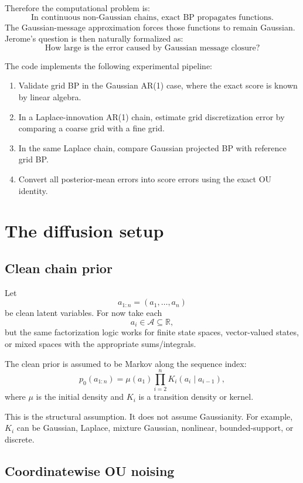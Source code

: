 \documentclass[11pt]{article}
\newcommand{\R}{\mathbb{R}}
\begin{document}
Therefore the computational problem is:
\[
\boxed{\text{In continuous non-Gaussian chains, exact BP propagates functions.}}
\]
The Gaussian-message approximation forces those functions to remain Gaussian. Jerome's question is then naturally formalized as:
\[
\boxed{\text{How large is the error caused by Gaussian message closure?}}
\]

The code implements the following experimental pipeline:
\begin{enumerate}[label=\arabic*.]
  \item Validate grid BP in the Gaussian AR(1) case, where the exact score is known by linear algebra.
  \item In a Laplace-innovation AR(1) chain, estimate grid discretization error by comparing a coarse grid with a fine grid.
  \item In the same Laplace chain, compare Gaussian projected BP with reference grid BP.
  \item Convert all posterior-mean errors into score errors using the exact OU identity.
\end{enumerate}

\section{The diffusion setup}

\subsection{Clean chain prior}

Let
\[
  a_{1:n}=(a_1,\ldots,a_n)
\]
be clean latent variables. For now take each
\[
  a_i\in\mathcal A\subseteq \R,
\]
but the same factorization logic works for finite state spaces, vector-valued states, or mixed spaces with the appropriate sums/integrals.

The clean prior is assumed to be Markov along the sequence index:
\begin{equation}
  p_0(a_{1:n})
  = \mu(a_1)\prod_{i=2}^n K_i(a_i\mid a_{i-1}),
  \label{eq:markov-prior}
\end{equation}
where \(\mu\) is the initial density and \(K_i\) is a transition density or kernel.

This is the structural assumption. It does not assume Gaussianity. For example, \(K_i\) can be Gaussian, Laplace, mixture Gaussian, nonlinear, bounded-support, or discrete.

\subsection{Coordinatewise OU noising}
\end{document}
